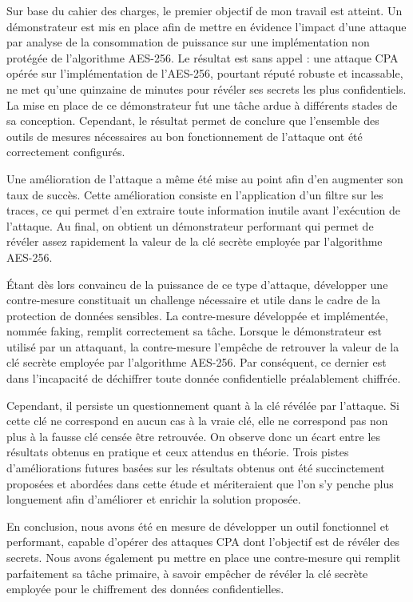 \documentclass[oneside]{book}
\begin{document}
Sur base du cahier des charges, le premier objectif de mon travail est atteint. Un démonstrateur est mis en place afin de mettre en évidence l’impact d’une attaque par analyse de la consommation de puissance sur une implémentation non protégée de l’algorithme AES-256. Le résultat est sans appel : une attaque CPA opérée sur l’implémentation de l’AES-256, pourtant réputé robuste et incassable, ne met qu’une quinzaine de minutes pour révéler ses secrets les plus confidentiels. La mise en place de ce démonstrateur fut une tâche ardue à différents stades de sa conception. Cependant, le résultat permet de conclure que l'ensemble des outils de mesures nécessaires au bon fonctionnement de l'attaque ont été correctement configurés. 

Une amélioration de l’attaque a même été mise au point afin d’en augmenter son taux de succès. Cette amélioration consiste en l’application d’un filtre sur les traces, ce qui permet d’en extraire toute information inutile avant l’exécution de l’attaque. Au final, on obtient un démonstrateur performant qui permet de révéler assez rapidement la valeur de la clé secrète employée par l’algorithme AES-256. 

Étant dès lors convaincu de la puissance de ce type d’attaque, développer une contre-mesure constituait un challenge nécessaire et utile dans le cadre de la protection de données sensibles. La contre-mesure développée et implémentée, nommée faking, remplit correctement sa tâche. Lorsque le démonstrateur est utilisé par un attaquant, la contre-mesure l'empêche de retrouver la valeur de la clé secrète employée par l’algorithme AES-256. Par conséquent, ce dernier est dans l’incapacité de déchiffrer toute donnée confidentielle préalablement chiffrée. 

Cependant, il persiste un questionnement quant à la clé révélée par l’attaque. Si cette clé ne correspond en aucun cas à la vraie clé, elle ne correspond pas non plus à la fausse clé censée être retrouvée. On observe donc un écart entre les résultats obtenus en pratique et ceux attendus en théorie. Trois pistes d’améliorations futures basées sur les résultats obtenus ont été succinctement proposées et abordées dans cette étude et mériteraient que l’on s’y penche plus longuement afin d’améliorer et enrichir la solution proposée. 

En conclusion, nous avons été en mesure de développer un outil fonctionnel et performant, capable d’opérer des attaques CPA dont l’objectif est de révéler des secrets. Nous avons également pu mettre en place une contre-mesure qui remplit parfaitement sa tâche primaire, à savoir empêcher de révéler la clé secrète employée pour le chiffrement des données confidentielles.
\end{document}
